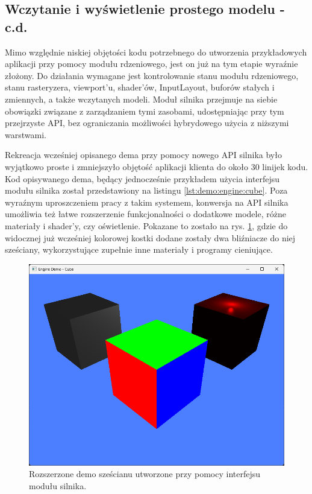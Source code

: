 \subsection{Wczytanie i wyświetlenie prostego modelu - c.d.}
Mimo względnie niskiej objętości kodu potrzebnego do utworzenia przykładowych aplikacji przy pomocy modułu rdzeniowego, jest on już na tym etapie wyraźnie złożony. Do działania wymagane jest kontrolowanie stanu modułu rdzeniowego, stanu rasteryzera, viewport'u, shader'ów, InputLayout, buforów stałych i zmiennych, a także wczytanych modeli. Moduł silnika przejmuje na siebie obowiązki związane z zarządzaniem tymi zasobami, udostępniając przy tym przejrzyste API, bez ograniczania możliwości hybrydowego użycia z niższymi warstwami. 

Rekreacja wcześniej opisanego dema przy pomocy nowego API silnika było wyjątkowo proste i zmniejszyło objętość aplikacji klienta do około 30 linijek kodu. Kod opisywanego dema, będący jednocześnie przykładem użycia interfejsu modułu silnika został przedstawiony na listingu \ref{lst:demo:engine:cube}. Poza wyraźnym uproszczeniem pracy z takim systemem, konwersja na API silnika umożliwia też łatwe rozszerzenie funkcjonalności o dodatkowe modele, różne materiały i shader'y, czy oświetlenie. Pokazane to zostało na rys. \ref{demo_engine_cube}, gdzie do widocznej już wcześniej kolorowej kostki dodane zostały dwa bliźniacze do niej sześciany, wykorzystujące zupełnie inne materiały i programy cieniujące.

\begin{figure}[h!]
	\centering
	\includegraphics[width=\textwidth]{images/demo_engine_cube.png}
	\caption{Rozszerzone demo sześcianu utworzone przy pomocy interfejsu modułu silnika.}
	\label{demo_engine_cube}
\end{figure}

